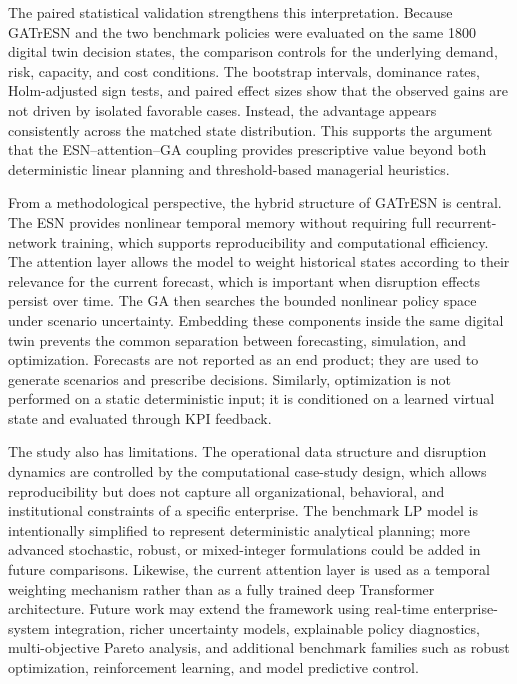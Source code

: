 \documentclass[apajournal,article,submit,pdftex,moreauthors]{Definitions/mdpi}
\begin{document}
The paired statistical validation strengthens this interpretation. Because GATrESN and the two benchmark policies were evaluated on the same 1800 digital twin decision states, the comparison controls for the underlying demand, risk, capacity, and cost conditions. The bootstrap intervals, dominance rates, Holm-adjusted sign tests, and paired effect sizes show that the observed gains are not driven by isolated favorable cases. Instead, the advantage appears consistently across the matched state distribution. This supports the argument that the ESN--attention--GA coupling provides prescriptive value beyond both deterministic linear planning and threshold-based managerial heuristics.

From a methodological perspective, the hybrid structure of GATrESN is central. The ESN provides nonlinear temporal memory without requiring full recurrent-network training, which supports reproducibility and computational efficiency. The attention layer allows the model to weight historical states according to their relevance for the current forecast, which is important when disruption effects persist over time. The GA then searches the bounded nonlinear policy space under scenario uncertainty. Embedding these components inside the same digital twin prevents the common separation between forecasting, simulation, and optimization. Forecasts are not reported as an end product; they are used to generate scenarios and prescribe decisions. Similarly, optimization is not performed on a static deterministic input; it is conditioned on a learned virtual state and evaluated through KPI feedback.

The study also has limitations. The operational data structure and disruption dynamics are controlled by the computational case-study design, which allows reproducibility but does not capture all organizational, behavioral, and institutional constraints of a specific enterprise. The benchmark LP model is intentionally simplified to represent deterministic analytical planning; more advanced stochastic, robust, or mixed-integer formulations could be added in future comparisons. Likewise, the current attention layer is used as a temporal weighting mechanism rather than as a fully trained deep Transformer architecture. Future work may extend the framework using real-time enterprise-system integration, richer uncertainty models, explainable policy diagnostics, multi-objective Pareto analysis, and additional benchmark families such as robust optimization, reinforcement learning, and model predictive control.
\end{document}
